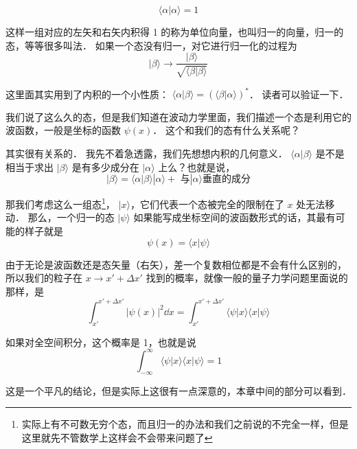 \begin{exam}{}
\begin{equation}
\langle\alpha|\alpha\rangle = 1
\end{equation}
\end{exam}

这样一组对应的左矢和右矢内积得 1 的称为单位向量，也叫归一的向量，归一的态，等等很多叫法． 如果一个态没有归一，对它进行归一化的过程为
\begin{equation}
|\beta\rangle\rightarrow\frac{|\beta\rangle}{\sqrt{\langle\beta|\beta\rangle}}
\end{equation}

这里面其实用到了内积的一个小性质： $\langle\alpha|\beta\rangle = (\langle\beta|\alpha\rangle)^*$． 读者可以验证一下．

我们说了这么久的态，但是我们知道在波动力学里面，我们描述一个态是利用它的波函数，一般是坐标的函数 $\psi(x)$． 这个和我们的态有什么关系呢？

其实很有关系的． 我先不着急透露，我们先想想内积的几何意义． $\langle\alpha|\beta\rangle$ 是不是相当于求出 $|\beta\rangle$ 是有多少成分在 $|\alpha\rangle$ 上么？也就是说，
\begin{equation}
|\beta\rangle = \langle\alpha|\beta\rangle|\alpha\rangle + \text{ 与}|\alpha\rangle\text{垂直的成分} 
\end{equation}

那我们考虑这么一组态\footnote{实际上有不可数无穷个态，而且归一的办法和我们之前说的不完全一样，但是这里就先不管数学上这样会不会带来问题了}， $|x\rangle$，它们代表一个态被完全的限制在了 $x$ 处无法移动． 那么，一个归一的态 $|\psi\rangle$ 如果能写成坐标空间的波函数形式的话，其最有可能的样子就是
\begin{equation}
\psi(x) = \langle x|\psi\rangle
\end{equation}

由于无论是波函数还是态矢量（右矢），差一个复数相位都是不会有什么区别的，所以我们的粒子在 $x\rightarrow x'+\Delta x'$ 找到的概率，就像一般的量子力学问题里面说的那样，是
\begin{equation}
\int_{x'}^{x'+\Delta x'}|\psi(x)|^2 \dd{x} = \int_{x'}^{x'+\Delta x'} \langle\psi|x\rangle\langle x|\psi\rangle
\end{equation}

如果对全空间积分，这个概率是 1，也就是说
\begin{equation}
\int_{-\infty}^{\infty}\langle\psi|x\rangle\langle x|\psi\rangle = 1
\end{equation}

这是一个平凡的结论，但是实际上这很有一点深意的，本章中间的部分可以看到．

